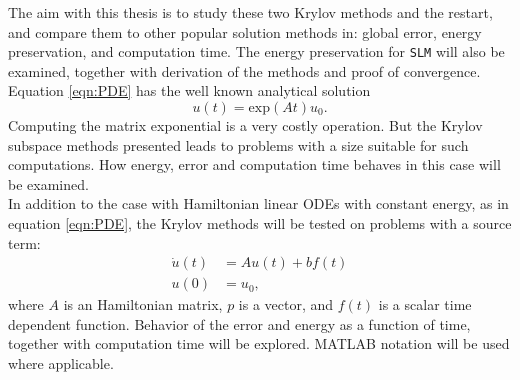 \noindent The aim with this thesis is to study these two Krylov methods and the restart, and compare them to other popular solution methods in: 
global error, energy preservation, and computation time. The energy preservation for \texttt{SLM} will also be examined, together with derivation of the methods and proof of convergence. \\

\noindent Equation \eqref{eqn:PDE} has the well known analytical solution 
\begin{equation*}
u(t) = \text{exp}(At)u_0.
\end{equation*}
Computing the matrix exponential is a very costly operation. But the Krylov subspace methods presented leads to problems with a size suitable for such computations. How energy, error and computation time behaves in this case will be examined.\\

\noindent In addition to the case with Hamiltonian linear ODEs with constant energy, as in equation \eqref{eqn:PDE}, the Krylov methods will be tested on problems with a source term:
\begin{equation}
\begin{aligned}
\dot{u}(t) &= A u(t) + b f(t)\\
u(0)&= u_0,
\end{aligned}
\label{eqn:PDE1}
\end{equation}
where $A$ is an Hamiltonian matrix, $p$ is a vector, and $f(t)$ is a scalar time dependent function. Behavior of the error and energy as a function of time, together with computation time will be explored.
MATLAB notation will be used where applicable.\\

